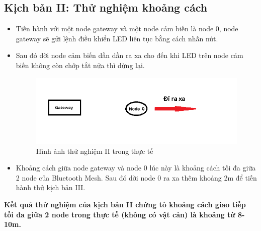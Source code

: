         \subsection{Kịch bản II: Thử nghiệm khoảng cách}
        \begin{itemize}
            \item Tiến hành với một node gateway và một node cảm biến là node 0, node gateway sẽ gửi lệnh điều khiển LED liên tục bằng cách nhấn nút.
            \item Sau đó dời node cảm biến dần dần ra xa cho đến khi LED trên node cảm biến không còn chớp tắt nữa thì dừng lại.
            \begin{figure}[h!]
	    	 \begin{center}
	    		\includegraphics[scale=0.8]{images/ex2-1.png}
	    		\caption{Hình ảnh thử nghiệm II trong thực tế}
	    	\end{center}
        	 \end{figure}
            \item Khoảng cách giữa node gateway và node 0 lúc này là khoảng cách tối đa giữa 2 node của Bluetooth Mesh. Sau đó dời node 0 ra xa thêm khoảng 2m để tiến hành thử kịch bản III.
        \end{itemize}
        \textbf{Kết quả thử nghiệm của kịch bản II chứng tỏ khoảng cách giao tiếp tối đa giữa 2 node trong thực tế (không có vật cản) là khoảng từ 8-10m.}
